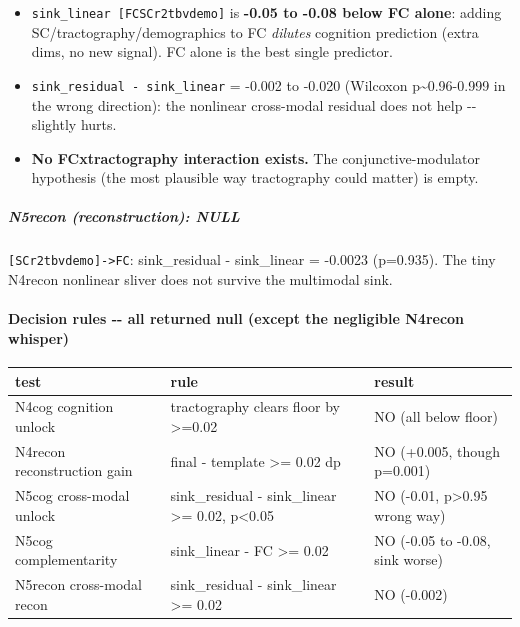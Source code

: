 \begin{itemize}
\tightlist
\item
  \texttt{sink\_linear\ {[}FC\textbar{}\textbar{}SC\textbar{}\textbar{}r2t\textbar{}\textbar{}bv\textbar{}\textbar{}demo{]}} is \textbf{-0.05 to -0.08 below FC alone}: adding SC/tractography/demographics to FC \emph{dilutes} cognition prediction (extra dims, no new signal). FC alone is the best single predictor.
\item
  \texttt{sink\_residual\ -\ sink\_linear} = -0.002 to -0.020 (Wilcoxon p\textasciitilde0.96-0.999 in the wrong direction): the nonlinear cross-modal residual does not help -\/- slightly hurts.
\item
  \textbf{No FCxtractography interaction exists.} The conjunctive-modulator hypothesis (the most plausible way tractography could matter) is empty.
\end{itemize}

\subparagraph{N5recon (reconstruction): NULL}\label{n5recon-reconstruction-null}

\texttt{{[}SC\textbar{}\textbar{}r2t\textbar{}\textbar{}bv\textbar{}\textbar{}demo{]}-\textgreater{}FC}: sink\_residual - sink\_linear = -0.0023 (p=0.935). The tiny N4recon nonlinear sliver does not survive the multimodal sink.

\paragraph{Decision rules -\/- all returned null (except the negligible N4recon whisper)}\label{decision-rules----all-returned-null-except-the-negligible-n4recon-whisper}

{\def\LTcaptype{none} %
\begin{longtable}[]{@{}lll@{}}
\toprule\noalign{}
test & rule & result \\
\midrule\noalign{}
\endhead
\bottomrule\noalign{}
\endlastfoot
N4cog cognition unlock & tractography clears floor by \textgreater=0.02 & NO (all below floor) \\
N4recon reconstruction gain & final - template \textgreater= 0.02 dp & NO (+0.005, though p=0.001) \\
N5cog cross-modal unlock & sink\_residual - sink\_linear \textgreater= 0.02, p\textless0.05 & NO (-0.01, p\textgreater0.95 wrong way) \\
N5cog complementarity & sink\_linear - FC \textgreater= 0.02 & NO (-0.05 to -0.08, sink worse) \\
N5recon cross-modal recon & sink\_residual - sink\_linear \textgreater= 0.02 & NO (-0.002) \\
\end{longtable}
}

